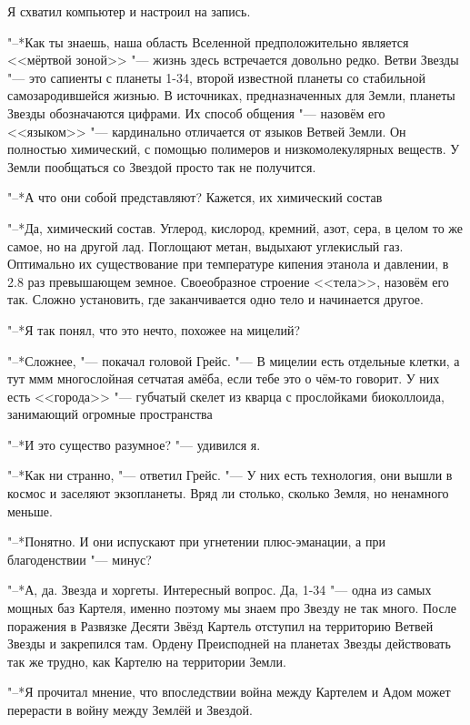 \documentclass[a4paper,10pt]{book}
\newcommand{\ldotst}{\so{...}\xspace}
\begin{document}
Я схватил компьютер и настроил на запись.

"--*Как ты знаешь, наша область Вселенной предположительно является <<мёртвой 
зоной>> "--- жизнь здесь встречается довольно редко. 
Ветви Звезды "--- это сапиенты с планеты 1-34, второй 
известной планеты со стабильной самозародившейся жизнью. В источниках, 
предназначенных для Земли, планеты Звезды обозначаются цифрами. Их способ 
общения "--- назовём его <<языком>> "--- кардинально отличается от языков 
Ветвей 
Земли. Он полностью химический, с помощью полимеров и низкомолекулярных 
веществ. У Земли пообщаться со Звездой просто так не получится.

"--*А что они собой представляют? Кажется, их химический состав\ldotst

"--*Да, химический состав. Углерод, кислород, кремний, азот, сера, в целом то 
же самое, но на другой лад. Поглощают метан, выдыхают углекислый газ. 
Оптимально их существование при температуре кипения этанола и давлении, в 2.8 
раз превышающем земное. Своеобразное строение <<тела>>, назовём его так. Сложно 
установить, где заканчивается одно тело и начинается другое.

"--*Я так понял, что это нечто, похожее на мицелий?

"--*Сложнее, "--- покачал головой Грейс. "--- В мицелии есть отдельные клетки, 
а 
тут\ldotst ммм\ldotst многослойная сетчатая амёба, если тебе это о чём-то 
говорит. У них есть <<города>> "--- губчатый скелет из кварца с прослойками 
биоколлоида, занимающий огромные пространства\ldotst

"--*И это существо разумное? "--- удивился я.

"--*Как ни странно, "--- ответил Грейс. "--- У них есть технология, они вышли в 
космос и заселяют экзопланеты. Вряд ли столько, сколько Земля, но ненамного 
меньше.

"--*Понятно. И они испускают при угнетении плюс-эманации, а при благоденствии 
"--- минус?

"--*А, да. Звезда и хоргеты. Интересный вопрос. Да, 1-34 "--- одна из самых 
мощных баз Картеля, именно поэтому мы знаем про Звезду не так много. После 
поражения в Развязке Десяти Звёзд Картель отступил на территорию Ветвей Звезды 
и закрепился там. Ордену Преисподней на планетах Звезды действовать так же 
трудно, как Картелю на территории Земли.

"--*Я прочитал мнение, что впоследствии война между Картелем и Адом может 
перерасти в войну между Землёй и Звездой.
\end{document}
